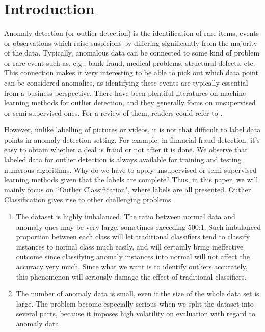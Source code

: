 \documentclass[english]{article}
\author{\authorthing}
\title{\textbf{\titlemark}}
\begin{document}
\maketitle


\section{Introduction}
\par Anomaly detection (or outlier detection) is the identification of rare items, events or observations which raise suspicions by differing significantly from the majority of the data. Typically, anomalous data can be connected to some kind of problem or rare event such as, e.g., bank fraud, medical problems, structural defects, etc. This connection makes it very interesting to be able to pick out which data point can be considered anomalies, as identifying these events are typically essential from a business perspective. There have been plentiful literatures on machine learning methods for outlier detection, and they generally focus on unsupervised or semi-supervised ones. For a review of them, readers could refer to \cite{review}.
\par However, unlike labelling of pictures or videos, it is not that difficult to label data points in anomaly detection setting. For example, in financial fraud detection, it's easy to obtain whether a deal is fraud or not after it is done. We observe that labeled data for outlier detection is always available for training and testing numerous algorithms. Why do we have to apply unsupervised or semi-supervised learning methods given that the labels are complete? Thus, in this paper, we will mainly focus on ``Outlier Classification", where labels are all presented.
\indent Outlier Classification gives rise to other challenging problems. 
\begin{enumerate}
\item The dataset is highly imbalanced. The ratio between normal data and anomaly ones may be very large, sometimes exceeding 500:1. Such imbalanced proportion between each class will let traditional classifiers tend to classify instances to normal class much easily, and will certainly bring ineffective outcome since classifying anomaly instances into normal will not affect the accuracy very much. Since what we want is to identify outliers accurately, this phenomenon will seriously damage the effect of traditional classifiers.
\item The number of anomaly data is small, even if the size of the whole data set is large. The problem become especially serious when we split the dataset into several parts, because it imposes high volatility on evaluation with regard to anomaly data.
\end{enumerate} 
\end{document}

